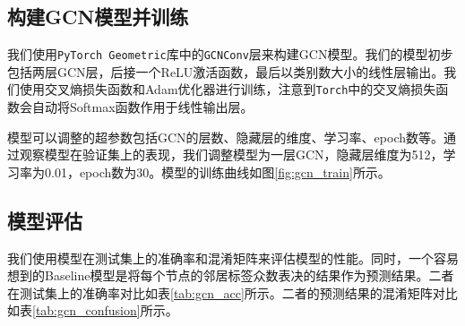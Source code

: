 \subsection{构建GCN模型并训练}
我们使用\texttt{PyTorch Geometric}库中的\texttt{GCNConv}层来构建GCN模型。我们的模型初步包括两层GCN层，后接一个ReLU激活函数，最后以类别数大小的线性层输出。我们使用交叉熵损失函数和Adam优化器进行训练，注意到\texttt{Torch}中的交叉熵损失函数会自动将Softmax函数作用于线性输出层。

模型可以调整的超参数包括GCN的层数、隐藏层的维度、学习率、epoch数等。通过观察模型在验证集上的表现，我们调整模型为一层GCN，隐藏层维度为512，学习率为0.01，epoch数为30。模型的训练曲线如图\ref{fig:gcn_train}所示。%

\subsection{模型评估}
我们使用模型在测试集上的准确率和混淆矩阵来评估模型的性能。同时，一个容易想到的Baseline模型是将每个节点的邻居标签众数表决的结果作为预测结果。二者在测试集上的准确率对比如表\ref{tab:gcn_acc}所示。二者的预测结果的混淆矩阵对比如表\ref{tab:gcn_confusion}所示。

